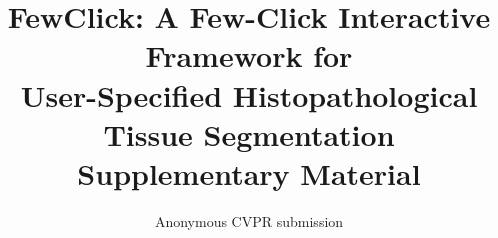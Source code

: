 \documentclass[10pt,twocolumn,letterpaper]{article}
\title{FewClick: A Few-Click Interactive Framework for\\User-Specified Histopathological Tissue Segmentation\\Supplementary Material}
\author{Anonymous CVPR submission}
\begin{document}
\maketitle

{\small}
\end{document}

